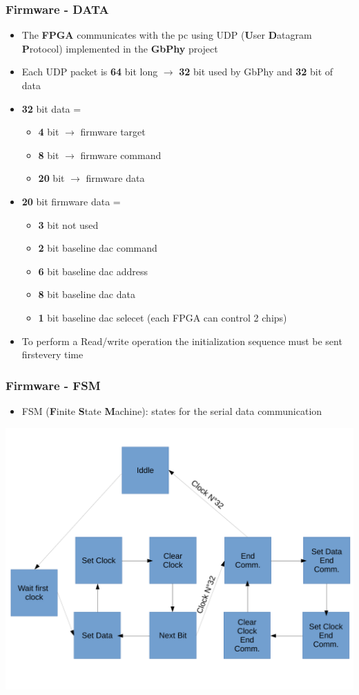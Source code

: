 \documentclass[aspectratio=169]{beamer}
\begin{document}
	\begin{frame}
	\frametitle{Firmware - DATA}
	\begin{itemize}
		\item The \textbf{FPGA} communicates with the pc using UDP (\textbf{U}ser \textbf{D}atagram \textbf{P}rotocol) implemented in the \textbf{GbPhy} project
		\item Each UDP packet is \textbf{64} bit long $\rightarrow$ \textbf{32} bit used by GbPhy and \textbf{32} bit of data
		\item \textbf{32} bit data =
		\begin{itemize}
			\item \textbf{4} bit $\rightarrow$ firmware target
			\item \textbf{8} bit $\rightarrow$ firmware command
			\item \textbf{20} bit $\rightarrow$ firmware data
		\end{itemize}
		\item \textbf{20} bit firmware data =
		\begin{itemize}
			\item \textbf{3} bit not used
			\item \textbf{2} bit baseline dac command
			\item \textbf{6} bit baseline dac address
			\item \textbf{8} bit baseline dac data
			\item \textbf{1} bit baseline dac selecet (each FPGA can control 2 chips)
		\end{itemize}
		\item To perform a Read/write operation the initialization sequence must be sent first\newline every time
	\end{itemize}
	\end{frame}

	\begin{frame}[fragile]
		\frametitle{Firmware - FSM}
		\begin{itemize}
			\item FSM (\textbf{F}inite \textbf{S}tate \textbf{M}achine): states for the serial data communication
		\end{itemize}
		\begin{center}
			\includegraphics[width=0.45 \textwidth]{IMG/FSM.pdf}
		\end{center}
	\end{frame}
\end{document}
